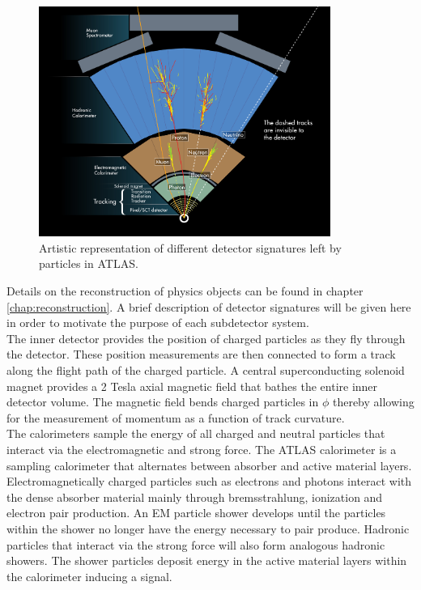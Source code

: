 \begin{figure}[h!]
\centering
\includegraphics[width=0.85\textwidth, angle=0]{figures/LHC_ATLAS/ATLAS_Signature.jpg}
\caption{ Artistic representation of different detector signatures left by particles in ATLAS.  \label{LHC:fig:ATLASSig}}
\end{figure}

\indent Details on the reconstruction of physics objects can be found in chapter \ref{chap:reconstruction}.  A brief description of detector signatures will be given here in order to motivate the purpose of each subdetector system. \\

\indent The inner detector provides the position of charged particles as they fly through the detector.  These position measurements are then connected to form a track along the flight path of the charged particle.  A central superconducting solenoid magnet provides a 2 Tesla axial magnetic field that bathes the entire inner detector volume.  The magnetic field bends charged particles in $\phi$ thereby allowing for the measurement of momentum as a function of track curvature.  \\

\indent The calorimeters sample the energy of all charged and neutral particles that interact via the electromagnetic and strong force.   The ATLAS calorimeter is a sampling calorimeter that alternates between absorber and active material layers.   Electromagnetically charged particles such as electrons and photons interact with the dense absorber material mainly through bremsstrahlung, ionization and electron pair production.  An EM particle shower develops until the particles within the shower no longer have the energy necessary to pair produce.  Hadronic particles that interact via the strong force will also form analogous hadronic showers.  The shower particles deposit energy in the active material layers within the calorimeter inducing a signal.  \\


